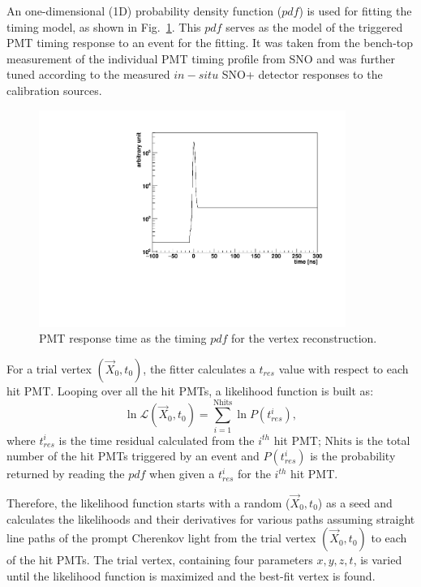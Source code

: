 An one-dimensional (1D) probability density function ($pdf$) is used for fitting the timing model, as shown in Fig.~\ref{fig:MPW_timingPDF}. This $pdf$ serves as the model of the triggered PMT timing response to an event for the fitting. It was taken from the bench-top measurement of the individual PMT timing profile from SNO\cite{jillings1996photomultiplier} and was further tuned according to the measured $in-situ$ SNO+ detector responses to the calibration sources\cite{anderson2021optical}.

\begin{figure}[!htb]
	\centering
	\includegraphics[width=10cm]{MPW_timingPDF.pdf}
	\caption{PMT response time as the timing $pdf$ for the vertex reconstruction.}
	\label{fig:MPW_timingPDF}
\end{figure}

For a trial vertex $(\vec{X}_0,t_0)$, the fitter calculates a $t_{res}$ value with respect to each hit PMT. Looping over all the hit PMTs, a likelihood function is built as:
\begin{equation}\label{eq:vertexLogL}
\ln\mathcal{L}(\vec{X}_0,t_0)=\sum_{i=1}^{{\mathrm{Nhits}}}\ln P(t^i_{res}),
\end{equation}
where $t^i_{res}$ is the time residual calculated from the $i^{th}$ hit PMT; $\mathrm{Nhits}$ is the total number of the hit PMTs triggered by an event and $P(t^i_{res})$ is the probability returned by reading the $pdf$ when given a $t^i_{res}$ for the $i^{th}$ hit PMT.

Therefore, the likelihood function starts with a random ($\vec{X}_0,t_0$) as a seed and calculates the likelihoods and their derivatives for various paths assuming straight line paths of the prompt Cherenkov light from the trial vertex $(\vec{X}_0,t_0)$ to each of the hit PMTs. The trial vertex, containing four parameters $x,y,z,t$, is varied until the likelihood function is maximized and the best-fit vertex is found.


